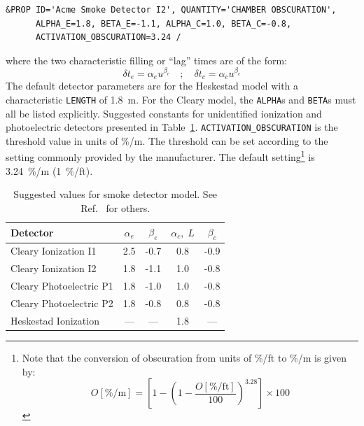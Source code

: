 \documentclass[11pt]{book}
\newcommand{\ct}{\tt\small}
\newcommand{\be}{\begin{equation}}
\newcommand{\ee}{\end{equation}}
\begin{document}
\footnotesize
\begin{verbatim}
&PROP ID='Acme Smoke Detector I2', QUANTITY='CHAMBER OBSCURATION',
      ALPHA_E=1.8, BETA_E=-1.1, ALPHA_C=1.0, BETA_C=-0.8,
      ACTIVATION_OBSCURATION=3.24 /
\end{verbatim}
\normalsize

\noindent
where the two characteristic filling or ``lag'' times are of the form:
\be \delta t_e = \alpha_e u^{\beta_e} \quad ; \quad \delta t_c = \alpha_c u^{\beta_c} \ee
The default detector parameters are for the Heskestad model with a characteristic {\ct LENGTH} of
1.8~m. For the Cleary model, the {\ct ALPHA}s and {\ct BETA}s must all be listed explicitly.
Suggested constants for unidentified ionization and photoelectric detectors
presented in Table~\ref{tab:sdvalues}.
{\ct ACTIVATION\_OBSCURATION} is the threshold value in units of \%/m.
The threshold can be set according to the setting commonly provided by the manufacturer.
The default setting\footnote{Note that the conversion of obscuration from units of \%/ft to \%/m is given by:
\be
O[\text{\%/m}] = \left[ 1 - \left( 1 - \frac{O[\text{\%/ft}]}{100} \right)^{3.28} \right] \times 100
\ee
} is 3.24~\%/m (1~\%/ft).

\begin{table}[ht]
\caption[Suggested values for smoke detector model]{Suggested values for smoke detector model. See Ref.~\cite{SFPE} for others.}
\vspace{0.1in}
\label{tab:sdvalues}
\begin{center}
\begin{tabular}{|l||c|c|c|c|}
\hline
Detector                      & $\alpha_e$  &  $\beta_e$   &  $\alpha_c, \; L$   &  $\beta_c$  \\ \hline \hline
Cleary Ionization    I1       & 2.5         & -0.7         &  0.8                &  -0.9      \\ \hline
Cleary Ionization    I2       & 1.8         & -1.1         &  1.0                &  -0.8      \\ \hline
Cleary Photoelectric P1       & 1.8         & -1.0         &  1.0                &  -0.8      \\ \hline
Cleary Photoelectric P2       & 1.8         & -0.8         &  0.8                &  -0.8      \\ \hline
Heskestad Ionization          & ---         & ---          &  1.8                &  ---       \\ \hline\end{tabular}
\end{center}
\end{table}
\end{document}
